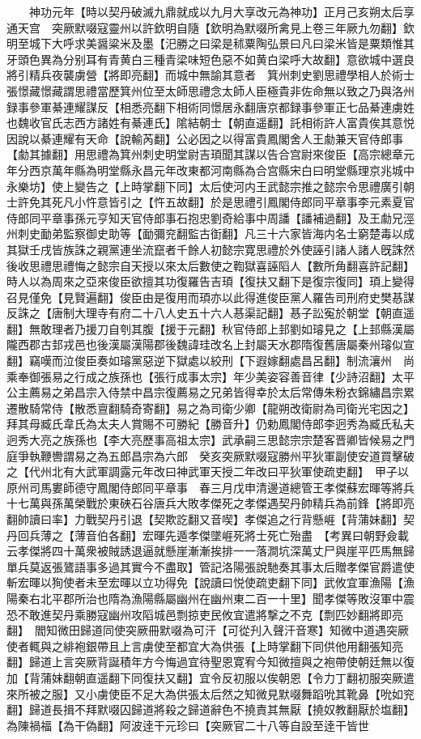 　　神功元年【時以契丹破滅九鼎就成以九月大享改元為神功】正月己亥朔太后享通天宫　突厥默啜寇靈州以許欽明自隨【欽明為默啜所禽見上卷三年厥九勿翻】欽明至城下大呼求美醤粱米及墨【汜勝之曰梁是秫粟陶弘景曰凡曰梁米皆是粟類惟其牙頭色異為分别耳有青黄白三種青梁味短色惡不如黄白梁呼大故翻】意欲城中選良將引精兵夜襲虜營【將即亮翻】而城中無諭其意者　箕州刺史劉思禮學相人於術士張憬藏憬藏謂思禮當歷箕州位至太師思禮念太師人臣極貴非佐命無以致之乃與洛州録事參軍綦連耀謀反【相悉亮翻下相術同憬居永翻唐京都録事參軍正七品綦連虜姓也魏收官氏志西方諸姓有綦連氏】隂結朝士【朝直遥翻】託相術許人富貴俟其意悦因說以綦連耀有天命【說輸芮翻】公必因之以得富貴鳳閣舍人王勮兼天官侍郎事【勮其據翻】用思禮為箕州刺史明堂尉吉頊聞其謀以告合宫尉來俊臣【高宗總章元年分西京萬年縣為明堂縣永昌元年改東都河南縣為合宫縣宋白曰明堂縣理京兆城中永樂坊】使上變告之【上時掌翻下同】太后使河内王武懿宗推之懿宗令思禮廣引朝士許免其死凡小忤意皆引之【忤五故翻】於是思禮引鳳閣侍郎同平章事李元素夏官侍郎同平章事孫元亨知天官侍郎事石抱忠劉奇給事中周譒【譒補過翻】及王勮兄涇州刺史勔弟監察御史助等【勔彌兖翻監古衘翻】凡三十六家皆海内名士窮楚毒以成其獄壬戌皆族誅之親黨連坐流竄者千餘人初懿宗寛思禮於外使誣引諸人諸人旣誅然後收思禮思禮悔之懿宗自天授以來太后數使之鞫獄喜誣䧟人【數所角翻喜許記翻】時人以為周來之亞來俊臣欲擅其功復羅告吉頊【復扶又翻下是復宗復同】頊上變得召見僅免【見賢遍翻】俊臣由是復用而頊亦以此得進俊臣黨人羅告司刑府史樊惎謀反誅之【唐制大理寺有府二十八人史五十六人惎渠記翻】惎子訟寃於朝堂【朝直遥翻】無敢理者乃援刀自刳其腹【援于元翻】秋官侍郎上邽劉如璿見之【上邽縣漢屬隴西郡古邽戎邑也後漢屬漢陽郡後魏諱珪改名上封屬天水郡隋復舊唐屬秦州璿似宣翻】竊嘆而泣俊臣奏如璿黨惡逆下獄處以絞刑【下遐嫁翻處昌呂翻】制流瀼州　尚乘奉御張易之行成之族孫也【張行成事太宗】年少美姿容善音律【少詩沼翻】太平公主薦易之弟昌宗入侍禁中昌宗復薦易之兄弟皆得幸於太后常傳朱粉衣錦繡昌宗累遷散騎常侍【散悉亶翻騎奇寄翻】易之為司衛少卿【龍朔改衛尉為司衛光宅因之】拜其母臧氏韋氏為太夫人賞賜不可勝紀【勝音升】仍勅鳳閣侍郎李迥秀為臧氏私夫迥秀大亮之族孫也【李大亮歷事高祖太宗】武承嗣三思懿宗宗楚客晋卿皆候易之門庭爭執鞭轡謂易之為五郎昌宗為六郎　癸亥突厥默啜寇勝州平狄軍副使安道買擊破之【代州北有大武軍調露元年改曰神武軍天授二年改曰平狄軍使疏吏翻】　甲子以原州司馬婁師德守鳳閣侍郎同平章事　春三月戊申清邊道總管王孝傑蘇宏暉等將兵十七萬與孫萬榮戰於東硤石谷唐兵大敗孝傑死之孝傑遇契丹帥精兵為前鋒【將即亮翻帥讀曰率】力戰契丹引退【契欺訖翻又音喫】孝傑追之行背懸崕【背蒲妹翻】契丹回兵薄之【薄音伯各翻】宏暉先遁孝傑墜崕死將士死亡殆盡　【考異曰朝野僉載云孝傑將四十萬衆被賊誘退逼就懸崖漸漸挨排一一落澗坑深萬丈尸與崖平匹馬無歸單兵莫返張鷟語事多過其實今不盡取】管記洛陽張說馳奏其事太后贈孝傑官爵遣使斬宏暉以狥使者未至宏暉以立功得免【說讀曰悦使疏吏翻下同】武攸宜軍漁陽【漁陽秦右北平郡所治也隋為漁陽縣屬幽州在幽州東二百一十里】聞孝傑等敗沒軍中震恐不敢進契丹乘勝寇幽州攻䧟城邑剽掠吏民攸宜遣將撃之不克【剽匹妙翻將即亮翻】　閻知微田歸道同使突厥冊默啜為可汗【可從刋入聲汗音寒】知微中道遇突厥使者輒與之緋袍銀帶且上言虜使至都宜大為供張【上時掌翻下同供他用翻張知亮翻】歸道上言突厥背誕積年方今悔過宜待聖恩寛宥今知微擅與之袍帶使朝廷無以復加【背蒲妹翻朝直遥翻下同復扶又翻】宜令反初服以俟朝恩【令力丁翻初服突厥遣來所被之服】又小虜使臣不足大為供張太后然之知微見默啜舞蹈吮其靴鼻【吮如兖翻】歸道長揖不拜默啜囚歸道將殺之歸道辭色不撓責其無厭【撓奴教翻厭於塩翻】為陳禍福【為干偽翻】阿波逹干元珍曰【突厥官二十八等自設至逹干皆世